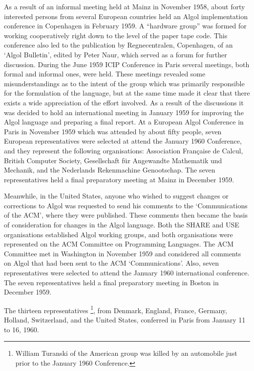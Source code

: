 \documentclass[a4paper,11pt]{article}
\begin{document}
As a result of an informal meeting held at Mainz in November 1958, about
forty interested persons from several European countries held an Algol
implementation conference in Copenhagen in February 1959.  A ``hardware
group'' was formed for working cooperatively right down to the level of
the paper tape code.  This conference also led to the publication by
Regnecentralen, Copenhagen, of an `Algol Bulletin', edited by Peter
Naur, which served as a forum for further discussion.  During the June
1959 ICIP Conference in Paris several meetings, both formal and informal
ones, were held.  These meetings revealed some misunderstandings as to
the intent of the group which was primarily responsible for the
formulation of the language, but at the same time made it clear that
there exists a wide appreciation of the effort involved.  As a result of
the discussions it was decided to hold an international meeting in
January 1959 for improving the Algol language and preparing a final
report.  At a European Algol Conference in Paris in November 1959 which
was attended by about fifty people, seven European representatives were
selected at attend the January 1960 Conference, and they represent the
following organisations: Association Fran\c caise de Calcul, British
Computer Society, Gesellschaft f\"ur Angewandte Mathematik und
Mechanik, and the Nederlands Rekenmachine Genootschap.  The seven
representatives held a final preparatory meeting at Mainz in December
1959.

Meanwhile, in the United States, anyone who wished to suggest changes or
corrections to Algol was requested to send his comments to the
`Communications of the ACM', where they were published.  These comments
then became the basis of consideration for changes in the Algol
language.  Both the SHARE and USE organisations established Algol
working groups, and both organisations were represented on the ACM
Committee on Programming Languages.  The ACM Committee met in Washington
in November 1959 and considered all comments on Algol that had been sent
to the ACM `Communications'.  Also, seven representatives were selected
to attend the January 1960 international conference.  The seven
representatives held a final preparatory meeting in Boston in December
1959. 





The thirteen representatives \footnote{William Turanski of the
American group was killed by an automobile just prior to the January
1960 Conference.}, from Denmark, England, France, Germany, Holland,
Switzerland, and the United States, conferred in Paris from January 11
to 16, 1960.
\end{document}
